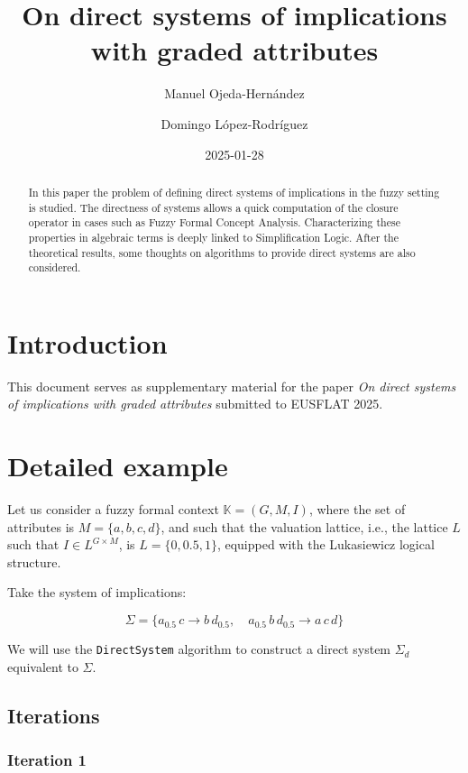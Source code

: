 \documentclass[
  letterpaper,
  DIV=11,
  numbers=noendperiod]{scrartcl}
\title{On direct systems of implications with graded attributes}
\author{Manuel Ojeda-Hernández \and Domingo López-Rodríguez}
\date{2025-01-28}
\begin{document}
\maketitle
\begin{abstract}
In this paper the problem of defining direct systems of implications in
the fuzzy setting is studied. The directness of systems allows a quick
computation of the closure operator in cases such as Fuzzy Formal
Concept Analysis. Characterizing these properties in algebraic terms is
deeply linked to Simplification Logic. After the theoretical results,
some thoughts on algorithms to provide direct systems are also
considered.
\end{abstract}


\newcommand{\el}[2]{#1_{#2}}

\section{Introduction}\label{introduction}

This document serves as supplementary material for the paper \emph{On
direct systems of implications with graded attributes} submitted to
EUSFLAT 2025.

\section{Detailed example}\label{detailed-example}

Let us consider a fuzzy formal context \(\mathbb K = (G, M, I)\), where
the set of attributes is \(M=\{a,b,c,d\}\), and such that the valuation
lattice, i.e., the lattice \(L\) such that \(I\in L^{G\times M}\), is
\(L=\{0, 0.5, 1\}\), equipped with the Lukasiewicz logical structure.

Take the system of implications:

\[\Sigma = \{a_{0.5}\,c \to b\,d_{0.5}, \quad a_{0.5}\,b\,d_{0.5} \to a\,c\,d\}\]

We will use the \texttt{DirectSystem} algorithm to construct a direct
system \(\Sigma_d\) equivalent to \(\Sigma\).

\subsection{Iterations}\label{iterations}

\subsubsection{Iteration 1}\label{iteration-1}
\end{document}

